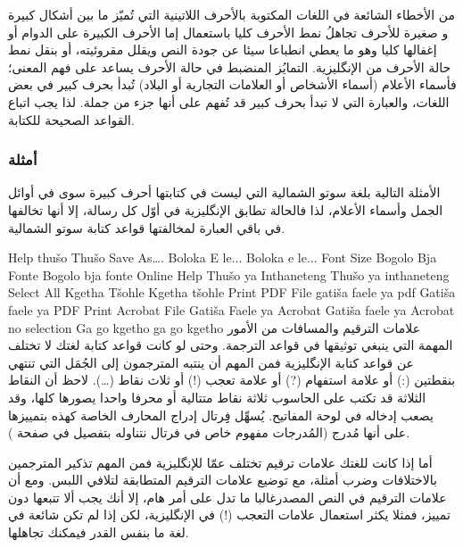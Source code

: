 من الأخطاء الشائعة في اللغات المكتوبة بالأحرف اللاتينية التي تُميّز ما
بين أشكال كبيرة و صغيرة للأحرف تجاهلُ نمط الأحرف كليا باستعمال إما
الأحرف الكبيرة على الدوام أو إغفالها كليا وهو ما يعطي انطباعا سيئا عن
جودة النص ويقلل مقروئيته، أو بنقل نمط حالة الأحرف من الإنگليزية.
التمايُز المنضبط في حالة الأحرف يساعد على فهم المعنى؛ فأسماء الأعلام
(أسماء الأشخاص أو العلامات التجارية أو البلاد) تُبدأ بحرف كبير في بعض
اللغات، والعبارة التي لا تبدأ بحرف كبير قد تُفهم على أنها جزء من جملة.
لذا يجب اتباع القواعد الصحيحة للكتابة. 

\subsubsection{أمثلة}
الأمثلة التالية بلغة سوتو الشمالية التي ليست في كتابتها أحرف كبيرة سوى
في أوائل الجمل وأسماء الأعلام، لذا فالحالة تطابق الإنگليزية في أوّل كل
رسالة، إلا أنها تخالفها في باقي العبارة لمخالفتها قواعد كتابة سوتو
الشمالية.

\starttable[|l|l|l|]
\HL
\NC {} \NC {} \NC
{}\NC\AR
\HL
\NC Help \NC thušo \NC Thušo\NC\AR
\HL
\NC Save As…. \NC Boloka E le... \NC Boloka e le...\NC\AR
\HL
\NC Font Size \NC Bogolo Bja Fonte \NC Bogolo bja fonte\NC\AR
\HL
\NC Online Help \NC Thušo ya Inthaneteng \NC Thušo ya inthaneteng\NC\AR
\HL
\NC Select All \NC Kgetha Tšohle \NC Kgetha tšohle\NC\AR
\HL
\NC Print PDF File \NC gatiša faele ya pdf \NC Gatiša faele ya PDF\NC\AR
\HL
\NC Print Acrobat File \NC Gatiša Faele ya Acrobat \NC Gatiša faele ya
Acrobat\NC\AR
\HL
\NC no selection \NC Ga go kgetho \NC ga go kgetho\NC\AR
\HL
\stoptable
علامات الترقيم والمسافات من الأمور المهمة التي ينبغي توثيقها في قواعد
الترجمة. وحتى لو كانت قواعد كتابة لغتك لا تختلف عن قواعد كتابة
الإنگليزية فمن المهم أن ينتبه المترجمون إلى الجُمَل التي تنتهي بنقطتين
(:) أو علامة استفهام (?) أو علامة تعجب (!) أو ثلاث نقاط (…). لاحظ أن
النقاط الثلاثة قد تكتب على الحاسوب ثلاثة نقاط متتالية أو محرفا واحدا
يصورها كلها، وقد يصعب إدخاله في لوحة المفاتيح. يُسهِّل فِِرتال إدراج
المحارف الخاصة كهذه بتمييزها على أنها مُدرج (المُدرجات مفهوم خاص في
فرتال نتناوله بتفصيل في صفحة \at[ref:32596109]).

أما إذا كانت للغتك علامات ترقيم تختلف عمّا للإنگليزية فمن المهم تذكير
المترجمين بالاختلافات وضرب أمثلة، مع توضيع علامات الترقيم المتطابقة
لتلافي اللبس. ومع أن علامات الترقيم في النص المصدرغالبا ما تدل على أمر
هام، إلا أنك يجب ألا تتبعها دون تمييز، فمثلا يكثر استعمال علامات التعجب
(!) في الإنگليزية، لكن إذا لم تكن شائعة في لغة ما بنفس القدر فيمكنك
تجاهلها.

